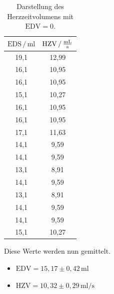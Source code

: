 \begin{table}[H]
  \centering
  \caption{Darstellung des Herzzeitvolumens mit $\text{EDV} =0$.}
  \label{tab:7}
  \begin{tabular}{c c}
    \toprule
     $\text{EDS}\,/\,\si{\milli\litre}$ &
     $\text{HZV} \,/\, \si[per-mode=fraction]{\milli\litre\per\second}$ \\
     \midrule
      19,1 & 12,99 \\
      16,1 & 10,95\\
      16,1 & 10,95\\
      15,1 & 10,27\\
      16,1 & 10,95\\
      16,1 & 10,95\\
      17,1 & 11,63\\
      14,1 & 9,59\\
      14,1 & 9,59\\
      13,1 & 8,91\\
      14,1 & 9,59\\
      13,1 & 8,91\\
      14,1 & 9,59\\
      14,1 & 9,59\\
      15,1 & 10,27\\
     \bottomrule
  \end{tabular}
\end{table}
Diese Werte werden nun gemittelt.
\begin{itemize}
  \item $\text{EDV} = 15,17 \pm 0,42\, \si{\milli\litre}$
  \item $\text{HZV} = 10,32 \pm 0,29\, \si{\milli\litre\per\second}$
\end{itemize}
